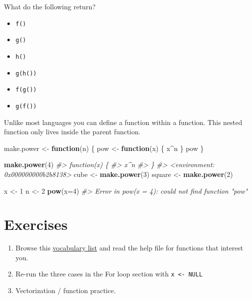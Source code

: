 \documentclass[]{book}
\newenvironment{Shaded}{\begin{snugshade}}{\end{snugshade}}
\newcommand{\KeywordTok}[1]{\textcolor[rgb]{0.13,0.29,0.53}{\textbf{#1}}}
\newcommand{\DataTypeTok}[1]{\textcolor[rgb]{0.13,0.29,0.53}{#1}}
\newcommand{\DecValTok}[1]{\textcolor[rgb]{0.00,0.00,0.81}{#1}}
\newcommand{\StringTok}[1]{\textcolor[rgb]{0.31,0.60,0.02}{#1}}
\newcommand{\CommentTok}[1]{\textcolor[rgb]{0.56,0.35,0.01}{\textit{#1}}}
\newcommand{\ControlFlowTok}[1]{\textcolor[rgb]{0.13,0.29,0.53}{\textbf{#1}}}
\newcommand{\OperatorTok}[1]{\textcolor[rgb]{0.81,0.36,0.00}{\textbf{#1}}}
\newcommand{\NormalTok}[1]{#1}
\providecommand{\tightlist}{%
  \setlength{\itemsep}{0pt}\setlength{\parskip}{0pt}}
\theoremstyle{definition}
\theoremstyle{definition}
\theoremstyle{definition}
\theoremstyle{remark}
\begin{document}
What do the following return?

\begin{itemize}
\tightlist
\item
  \texttt{f()}
\item
  \texttt{g()}
\item
  \texttt{h()}
\item
  \texttt{g(h())}
\item
  \texttt{f(g())}
\item
  \texttt{g(f())}
\end{itemize}

Unlike most languages you can define a function within a function. This
nested function only lives inside the parent function.

\begin{Shaded}
\begin{Highlighting}[]
\NormalTok{make.power <-}\StringTok{ }\ControlFlowTok{function}\NormalTok{(n) \{}
\NormalTok{  pow <-}\StringTok{ }\ControlFlowTok{function}\NormalTok{(x) \{}
\NormalTok{    x}\OperatorTok{^}\NormalTok{n }
\NormalTok{  \}}
\NormalTok{  pow}
\NormalTok{\}}

\KeywordTok{make.power}\NormalTok{(}\DecValTok{4}\NormalTok{)}
\CommentTok{#> function(x) \{}
\CommentTok{#>     x^n }
\CommentTok{#>   \}}
\CommentTok{#> <environment: 0x000000000b2b8138>}
\NormalTok{cube <-}\StringTok{ }\KeywordTok{make.power}\NormalTok{(}\DecValTok{3}\NormalTok{)}
\NormalTok{square <-}\StringTok{ }\KeywordTok{make.power}\NormalTok{(}\DecValTok{2}\NormalTok{)}

\NormalTok{x <-}\StringTok{ }\DecValTok{1}
\NormalTok{n <-}\StringTok{ }\DecValTok{2}
\KeywordTok{pow}\NormalTok{(}\DataTypeTok{x=}\DecValTok{4}\NormalTok{)}
\CommentTok{#> Error in pow(x = 4): could not find function "pow"}
\end{Highlighting}
\end{Shaded}

\section{Exercises}\label{exercises-1}

\begin{enumerate}
\def\labelenumi{\arabic{enumi}.}
\tightlist
\item
  Browse this \href{http://adv-r.had.co.nz/Vocabulary.html}{vocabulary
  list} and read the help file for functions that interest you.
\item
  Re-run the three cases in the For loop section with
  \texttt{x\ \textless{}-\ NULL}
\item
  Vectorization / function practice.
\end{enumerate}
\end{document}
